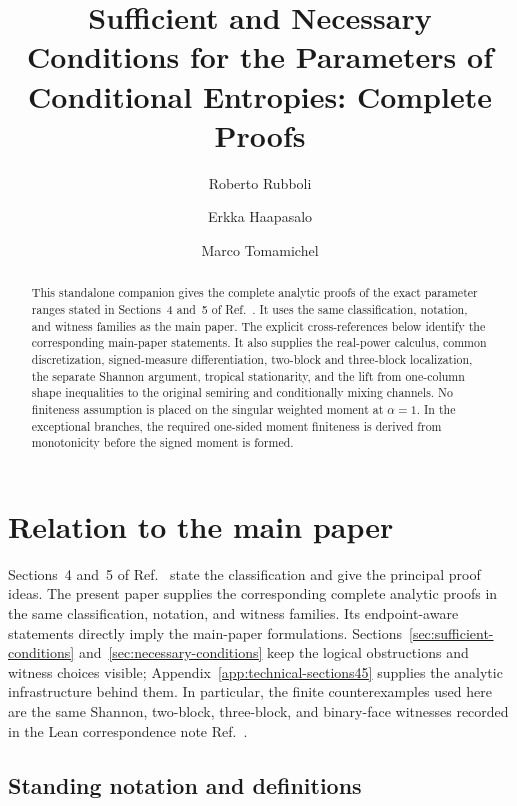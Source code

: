 \documentclass[aps,pra,11pt,onecolumn,nofootinbib,tightenlines]{revtex4-2}
\theoremstyle{definition}
\begin{document}
\title{Sufficient and Necessary Conditions for the Parameters of Conditional Entropies: Complete Proofs}

\begin{abstract}
This standalone companion gives the complete analytic proofs of the exact
parameter ranges stated in Sections~4 and~5 of
Ref.~\cite{rubboli2026complete}. It uses the same classification, notation,
and witness families as the main paper. The explicit cross-references below
identify the corresponding main-paper statements. It
also supplies the real-power
calculus, common discretization, signed-measure differentiation, two-block and
three-block localization, the separate Shannon argument, tropical stationarity,
and the lift from one-column shape inequalities to the original semiring and
conditionally mixing channels. No finiteness assumption is placed on the
singular weighted moment at $\alpha=1$. In the exceptional branches, the required one-sided moment
finiteness is derived from monotonicity before the signed moment is formed.
\end{abstract}

\author{Roberto Rubboli}
\noaffiliation
\author{Erkka Haapasalo}
\noaffiliation
\author{Marco Tomamichel}
\noaffiliation

\maketitle
\tableofcontents

\section*{Relation to the main paper}

Sections~4 and~5 of Ref.~\cite{rubboli2026complete} state the classification
and give the principal proof ideas. The present paper supplies the corresponding
complete analytic proofs in the same classification, notation, and witness
families. Its endpoint-aware statements directly imply the main-paper
formulations.
Sections~\ref{sec:sufficient-conditions}
and~\ref{sec:necessary-conditions} keep the logical obstructions and witness
choices visible; Appendix~\ref{app:technical-sections45} supplies the analytic
infrastructure behind them.  In particular, the finite counterexamples used
here are the same Shannon, two-block, three-block, and binary-face witnesses
recorded in the Lean correspondence note
Ref.~\cite{rubboli2026parametersLean}.

\subsection*{Standing notation and definitions}
\end{document}
